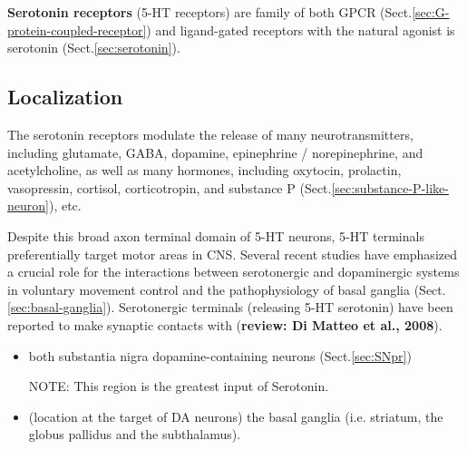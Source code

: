 {\bf Serotonin receptors} (5-HT receptors) are family of both GPCR
(Sect.\ref{sec:G-protein-coupled-receptor}) and ligand-gated receptors with the
natural agonist is serotonin (Sect.\ref{sec:serotonin}).



\subsection{Localization}

The serotonin receptors modulate the release of many neurotransmitters,
including glutamate, GABA, dopamine, epinephrine / norepinephrine, and
acetylcholine, as well as many hormones, including oxytocin, prolactin,
vasopressin, cortisol, corticotropin, and substance P
(Sect.\ref{sec:substance-P-like-neuron}), etc.

Despite this broad axon terminal domain of 5-HT neurons, 5-HT terminals
preferentially target motor areas in CNS.
Several recent studies have emphasized a crucial role for the interactions
between serotonergic and dopaminergic systems in voluntary movement control and
the pathophysiology of basal ganglia (Sect.\ref{sec:basal-ganglia}).
Serotonergic terminals (releasing 5-HT serotonin) have been reported to make
synaptic contacts with ({\bf review: Di Matteo et al., 2008}).

\begin{itemize}
  
  \item  both substantia nigra
  dopamine-containing neurons (Sect.\ref{sec:SNpr})
  
NOTE: This region is the greatest input of Serotonin.
 
  \item (location at the target of DA neurons) the basal ganglia (i.e.
  striatum, the globus pallidus and the subthalamus).
\end{itemize}

